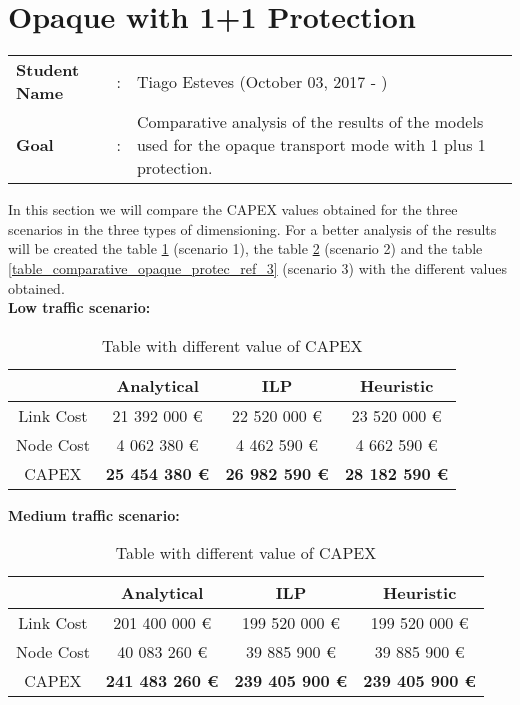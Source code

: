 \clearpage

\section{Opaque with 1+1 Protection}\label{comparative_Opaque_Protection}
\begin{tcolorbox}	
\begin{tabular}{p{2.75cm} p{0.2cm} p{10.5cm}} 	
\textbf{Student Name}  &:& Tiago Esteves    (October 03, 2017 - )\\
\textbf{Goal}          &:& Comparative analysis of the results of the models used for the opaque transport mode with 1 plus 1 protection.
\end{tabular}
\end{tcolorbox}
\vspace{11pt}


In this section we will compare the CAPEX values obtained for the three scenarios in the three types of dimensioning. For a better analysis of the results will be created the table \ref{table_comparative_opaque_protec_ref_1} (scenario 1), the table \ref{table_comparative_opaque_protec_ref_2} (scenario 2) and the table \ref{table_comparative_opaque_protec_ref_3} (scenario 3) with the different values obtained.\\

\textbf{Low traffic scenario:}\\

\begin{table}[h!]
\centering
\begin{tabular}{| c | c | c | c |}
 \hline
   & Analytical & ILP & Heuristic \\
 \hline\hline
 Link Cost & 21 392 000 \euro & 22 520 000 \euro & 23 520 000 \euro \\
 Node Cost & 4 062 380 \euro & 4 462 590 \euro & 4 662 590 \euro \\
 CAPEX & \textbf{25 454 380 \euro} & \textbf{26 982 590 \euro} & \textbf{28 182 590 \euro} \\
 \hline
\end{tabular}
\caption{Table with different value of CAPEX }
\label{table_comparative_opaque_protec_ref_1}
\end{table}


\vspace{11pt}
\textbf{Medium traffic scenario:}\\

\begin{table}[h!]
\centering
\begin{tabular}{| c | c | c | c |}
 \hline
   & Analytical & ILP & Heuristic \\
 \hline\hline
 Link Cost & 201 400 000 \euro & 199 520 000 \euro & 199 520 000 \euro \\
 Node Cost & 40 083 260 \euro & 39 885 900 \euro & 39 885 900 \euro \\
 CAPEX & \textbf{241 483 260 \euro} & \textbf{239 405 900 \euro} & \textbf{239 405 900 \euro} \\
 \hline
\end{tabular}
\caption{Table with different value of CAPEX }
\label{table_comparative_opaque_protec_ref_2}
\end{table}



